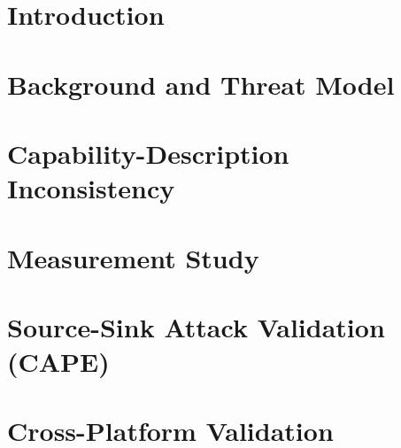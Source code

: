 \documentclass[letterpaper,twocolumn,10pt]{article}
\theoremstyle{definition}
\begin{document}
\section{Introduction}
\label{sec:intro}



\section{Background and Threat Model}
\label{sec:background}



\section{Capability-Description Inconsistency}
\label{sec:taxonomy}



\section{Measurement Study}
\label{sec:measurement}



\section{Source-Sink Attack Validation (CAPE)}
\label{sec:cape}



\section{Cross-Platform Validation}
\label{sec:crossplatform}
\end{document}
